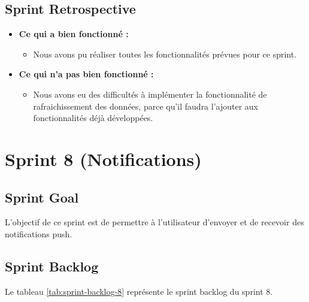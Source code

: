 \subsection{Sprint Retrospective}

\begin{itemize}
  \item \textbf{Ce qui a bien fonctionné :}
  \begin{itemize}
    \item Nous avons pu réaliser toutes les fonctionnalités prévues pour ce sprint.
  \end{itemize}

    \item \textbf{Ce qui n'a pas bien fonctionné :}
    \begin{itemize}
      \item Nous avons eu des difficultés à implémenter la fonctionnalité de rafraichissement des données, parce qu'il faudra l'ajouter aux fonctionnalités déjà développées.
    \end{itemize}
      
\end{itemize}
\section{Sprint 8 (Notifications)}

\subsection{Sprint Goal}
L'objectif de ce sprint est de permettre à l'utilisateur d'envoyer et de recevoir des notifications push.

\subsection{Sprint Backlog}

Le tableau \ref{tab:sprint-backlog-8} représente le sprint backlog du sprint 8.

